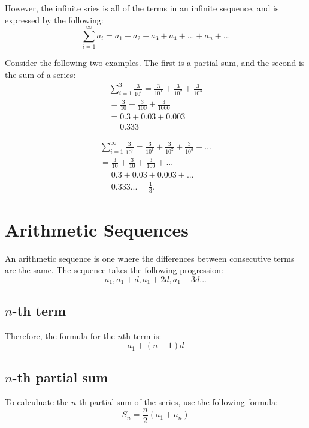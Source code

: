 However, the infinite sries is all of the terms in an infinite sequence, and is
expressed by the following:
\begin{equation}
\sum_{i=1}^{\infty}a_i=a_1+a_2+a_3+a_4+...+a_n+...
\end{equation}

Consider the following two examples.  The first is a partial sum, and the second
is the sum of a series:
\begin{align*}
\sum_{i=1}^{3}\frac{3}{10^i}=\frac{3}{10^1}+\frac{3}{10^2}+\frac{3}{10^3}\\
=\frac{3}{10}+\frac{3}{100}+\frac{3}{1000}\\
=0.3+0.03+0.003\\
=0.333
\end{align*}

\begin{align*}
\sum_{i=1}^{\infty}\frac{3}{10^i}=\frac{3}{10^1}+\frac{3}{10^2}+\frac{3}{10^3}+...
\\
=\frac{3}{10}+\frac{3}{10}+\frac{3}{100}+...\\
=0.3+0.03+0.003+...\\
=0.333...
=\frac{1}{3}.
\end{align*}

\section{Arithmetic Sequences}
An arithmetic sequence is one where the differences between consecutive terms
are the same.  The sequence takes the following progression:
\begin{equation}
  a_1,a_1+d,a_1+2d,a_1+3d...
\end{equation}

\subsection{$n$-th term}
Therefore, the formula for the $n$th term is:
\begin{equation}
  a_1+(n-1)d
\end{equation}

\subsection{$n$-th partial sum}
To calculuate the $n$-th partial sum of the series, use the following formula:
\begin{equation}
  S_n=\frac{n}{2}(a_1+a_n)
\end{equation}

